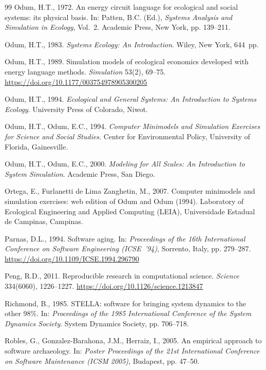 \documentclass[3p,times,authoryear,twocolumn]{elsarticle}
\begin{document}
\begin{thebibliography}{99}
Odum, H.T., 1972. An energy circuit language for ecological and social systems: its physical basis. In: Patten, B.C. (Ed.), \emph{Systems Analysis and Simulation in Ecology}, Vol.~2. Academic Press, New York, pp. 139--211.

Odum, H.T., 1983. \emph{Systems Ecology: An Introduction}. Wiley, New York, 644~pp.

Odum, H.T., 1989. Simulation models of ecological economics developed with energy language methods. \emph{Simulation} 53(2), 69--75. \url{https://doi.org/10.1177/003754978905300205}

Odum, H.T., 1994. \emph{Ecological and General Systems: An Introduction to Systems Ecology}. University Press of Colorado, Niwot.

Odum, H.T., Odum, E.C., 1994. \emph{Computer Minimodels and Simulation Exercises for Science and Social Studies}. Center for Environmental Policy, University of Florida, Gainesville.

Odum, H.T., Odum, E.C., 2000. \emph{Modeling for All Scales: An Introduction to System Simulation}. Academic Press, San Diego.

Ortega, E., Furlanetti de Lima Zanghetin, M., 2007. Computer minimodels and simulation exercises: web edition of Odum and Odum (1994). Laboratory of Ecological Engineering and Applied Computing (LEIA), Universidade Estadual de Campinas, Campinas.

Parnas, D.L., 1994. Software aging. In: \emph{Proceedings of the 16th International Conference on Software Engineering (ICSE~'94)}, Sorrento, Italy, pp. 279--287. \url{https://doi.org/10.1109/ICSE.1994.296790}

Peng, R.D., 2011. Reproducible research in computational science. \emph{Science} 334(6060), 1226--1227. \url{https://doi.org/10.1126/science.1213847}

Richmond, B., 1985. STELLA: software for bringing system dynamics to the other 98\%. In: \emph{Proceedings of the 1985 International Conference of the System Dynamics Society}. System Dynamics Society, pp. 706--718.

Robles, G., Gonzalez-Barahona, J.M., Herraiz, I., 2005. An empirical approach to software archaeology. In: \emph{Poster Proceedings of the 21st International Conference on Software Maintenance (ICSM 2005)}, Budapest, pp. 47--50.


\end{thebibliography}
\end{document}
